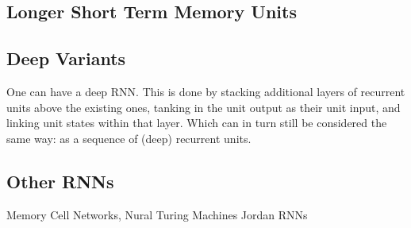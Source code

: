 \documentclass[12pt,parskip]{komatufte}
\begin{document}
\subsection{Longer Short Term Memory Units}

\subsection{Deep Variants}
One can have a deep RNN.
This is done by stacking additional layers of recurrent units above the existing ones,
tanking in the unit output as their unit input, and linking unit states within that layer.
Which can in turn still be considered the same way: as a sequence of (deep) recurrent units.

\subsection{Other RNNs}
Memory Cell Networks,
Nural Turing Machines
Jordan RNNs

 
\end{document}

